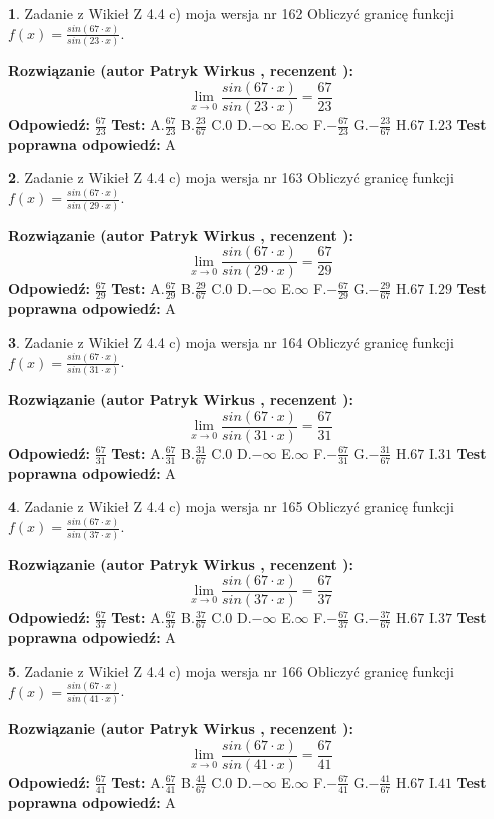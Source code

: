 \documentclass[12pt, a4paper]{article}
\theoremstyle{definition} %
\newtheorem{zad}{}
\newcommand{\zadStart}[1]{\begin{zad}#1\newline}
\newcommand{\zadStop}{\end{zad}}
\newcommand{\rozwStart}[2]{\noindent \textbf{Rozwiązanie (autor #1 , recenzent #2): }\newline}
\newcommand{\rozwStop}{\newline}
\newcommand{\odpStart}{\noindent \textbf{Odpowiedź:}\newline}
\newcommand{\odpStop}{\newline}
\newcommand{\testStart}{\noindent \textbf{Test:}\newline}
\newcommand{\testStop}{\newline}
\newcommand{\kluczStart}{\noindent \textbf{Test poprawna odpowiedź:}\newline}
\newcommand{\kluczStop}{\newline}
\begin{document}
\zadStart{Zadanie z Wikieł Z 4.4 c) moja wersja nr 162}
Obliczyć granicę funkcji $f(x)=\frac{sin(67\cdot x)}{sin(23\cdot x)}$.
\zadStop
\rozwStart{Patryk Wirkus}{}
$$\lim\limits_{x\to 0}\frac{sin(67\cdot x)}{sin(23\cdot x)}=
\frac{67}{23}$$
\rozwStop
\odpStart
$\frac{67}{23}$
\odpStop
\testStart
A.$\frac{67}{23}$
B.$\frac{23}{67}$
C.$0$
D.$-\infty$
E.$\infty$
F.$-\frac{67}{23}$
G.$-\frac{23}{67}$
H.$67$
I.$23$
\testStop
\kluczStart
A
\kluczStop



\zadStart{Zadanie z Wikieł Z 4.4 c) moja wersja nr 163}
Obliczyć granicę funkcji $f(x)=\frac{sin(67\cdot x)}{sin(29\cdot x)}$.
\zadStop
\rozwStart{Patryk Wirkus}{}
$$\lim\limits_{x\to 0}\frac{sin(67\cdot x)}{sin(29\cdot x)}=
\frac{67}{29}$$
\rozwStop
\odpStart
$\frac{67}{29}$
\odpStop
\testStart
A.$\frac{67}{29}$
B.$\frac{29}{67}$
C.$0$
D.$-\infty$
E.$\infty$
F.$-\frac{67}{29}$
G.$-\frac{29}{67}$
H.$67$
I.$29$
\testStop
\kluczStart
A
\kluczStop



\zadStart{Zadanie z Wikieł Z 4.4 c) moja wersja nr 164}
Obliczyć granicę funkcji $f(x)=\frac{sin(67\cdot x)}{sin(31\cdot x)}$.
\zadStop
\rozwStart{Patryk Wirkus}{}
$$\lim\limits_{x\to 0}\frac{sin(67\cdot x)}{sin(31\cdot x)}=
\frac{67}{31}$$
\rozwStop
\odpStart
$\frac{67}{31}$
\odpStop
\testStart
A.$\frac{67}{31}$
B.$\frac{31}{67}$
C.$0$
D.$-\infty$
E.$\infty$
F.$-\frac{67}{31}$
G.$-\frac{31}{67}$
H.$67$
I.$31$
\testStop
\kluczStart
A
\kluczStop



\zadStart{Zadanie z Wikieł Z 4.4 c) moja wersja nr 165}
Obliczyć granicę funkcji $f(x)=\frac{sin(67\cdot x)}{sin(37\cdot x)}$.
\zadStop
\rozwStart{Patryk Wirkus}{}
$$\lim\limits_{x\to 0}\frac{sin(67\cdot x)}{sin(37\cdot x)}=
\frac{67}{37}$$
\rozwStop
\odpStart
$\frac{67}{37}$
\odpStop
\testStart
A.$\frac{67}{37}$
B.$\frac{37}{67}$
C.$0$
D.$-\infty$
E.$\infty$
F.$-\frac{67}{37}$
G.$-\frac{37}{67}$
H.$67$
I.$37$
\testStop
\kluczStart
A
\kluczStop



\zadStart{Zadanie z Wikieł Z 4.4 c) moja wersja nr 166}
Obliczyć granicę funkcji $f(x)=\frac{sin(67\cdot x)}{sin(41\cdot x)}$.
\zadStop
\rozwStart{Patryk Wirkus}{}
$$\lim\limits_{x\to 0}\frac{sin(67\cdot x)}{sin(41\cdot x)}=
\frac{67}{41}$$
\rozwStop
\odpStart
$\frac{67}{41}$
\odpStop
\testStart
A.$\frac{67}{41}$
B.$\frac{41}{67}$
C.$0$
D.$-\infty$
E.$\infty$
F.$-\frac{67}{41}$
G.$-\frac{41}{67}$
H.$67$
I.$41$
\testStop
\kluczStart
A
\kluczStop
\end{document}
